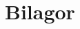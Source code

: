 \documentclass[a4paper,12pt]{article}
\begin{document}
\newpage
\appendix
\section{Bilagor} \label{app:rules}
%
%


%
%
\end{document}
